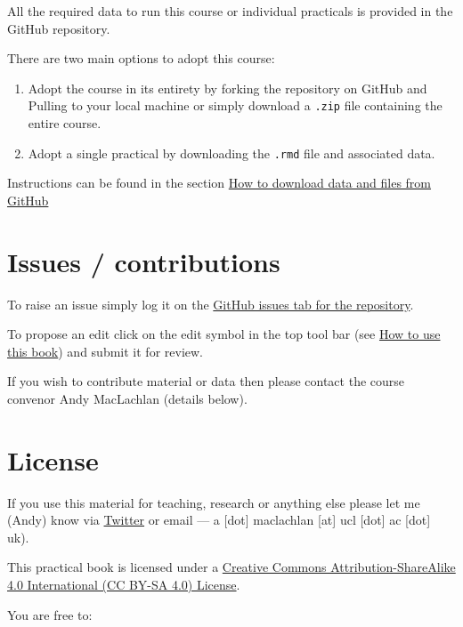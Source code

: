 \documentclass[
]{book}
\begin{document}
All the required data to run this course or individual practicals is provided in the GitHub repository.

There are two main options to adopt this course:

\begin{enumerate}
\def\labelenumi{\arabic{enumi}.}
\item
  Adopt the course in its entirety by forking the repository on GitHub and Pulling to your local machine or simply download a \texttt{.zip} file containing the entire course.
\item
  Adopt a single practical by downloading the \texttt{.rmd} file and associated data.
\end{enumerate}

Instructions can be found in the section \protect\hyperlink{how-to-download-data-and-files-from-github}{How to download data and files from GitHub}

\hypertarget{issues-contributions}{%
\section*{Issues / contributions}\label{issues-contributions}}

To raise an issue simply log it on the \href{}{GitHub issues tab for the repository}.

To propose an edit click on the edit symbol in the top tool bar (see \protect\hyperlink{how-to-use-this-book}{How to use this book}) and submit it for review.

If you wish to contribute material or data then please contact the course convenor Andy MacLachlan (details below).

\hypertarget{license}{%
\section*{License}\label{license}}

If you use this material for teaching, research or anything else please let me (Andy) know via \href{https://twitter.com/andymaclachlan}{Twitter} or email --- a {[}dot{]} maclachlan {[}at{]} ucl {[}dot{]} ac {[}dot{]} uk).

This practical book is licensed under a \href{https://creativecommons.org/licenses/by-sa/4.0/}{Creative Commons Attribution-ShareAlike 4.0 International (CC BY-SA 4.0) License}.

You are free to:
\end{document}
